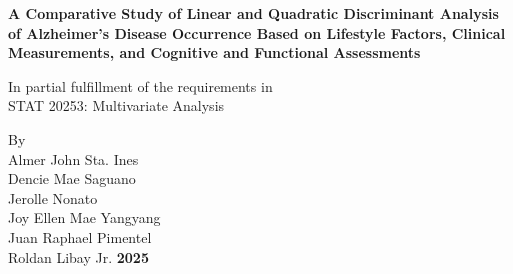 \documentclass[12pt]{article}
\begin{document}
\begin{titlepage}
    \thispagestyle{fancy}
    \fancyfoot[C]{\textcolor{white}{\thepage}}
    \centering
    \vspace*{2cm}  %
    \textbf{A Comparative Study of Linear and Quadratic Discriminant Analysis of Alzheimer's Disease Occurrence Based 
    on Lifestyle Factors, Clinical Measurements, and Cognitive and Functional Assessments}
    
    \vspace*{4cm} 
    \normalsize
    In partial fulfillment of the requirements in \\ 
    STAT 20253: Multivariate Analysis

    \vspace*{3cm}
    By \\ [0.5 cm]
    Almer John Sta. Ines \\ [0.3 cm]
    Dencie Mae Saguano \\ [0.3 cm]
    Jerolle Nonato \\ [0.3 cm]
    Joy Ellen Mae Yangyang \\ [0.3 cm]
    Juan Raphael Pimentel \\ [0.3 cm]
    Roldan Libay Jr. 
    \vfill
    \textbf{2025}
\end{titlepage}
\end{document}
